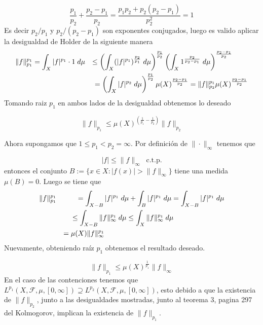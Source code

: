 \documentclass[12pt]{article}
\begin{document}
    \[\frac{p_1}{p_2}+\frac{p_2-p_1}{p_2} = \frac{p_1p_2+p_2(p_2-p_1)}{p_2^2} = 1\]
    Es decir $p_2/p_1$ y $p_2/(p_2-p_1)$ son exponentes conjugados, luego es valido aplicar 
    la desigualdad de Holder de la siguiente manera 
    \begin{equation*}
        \begin{aligned}
            & \|f\|_{p_1}^{p_1} = \int_X |f|^{p_1}\cdot1\;d\mu &\leq \left(\int_X (|f|^{p_1})^{\frac{p_2}{p_1}}\;d\mu\right)^{\frac{p_1}{p_2}}\left(\int_X 1^{\frac{p_2}{p_2-p_1}}\;d\mu\right)^{\frac{p_2-p_1}{p_2}}\hspace*{22pt} \\
            & & = \left(\int_X |f|^{p_2}\;d\mu\right)^{\frac{p_1}{p_2}}\mu(X)^{\frac{p_2-p_1}{p_2}} = \|f\|_{p_2}^{p_1}\mu(X)^{\frac{p_2-p_1}{p_2}}
        \end{aligned}
    \end{equation*}
    Tomando raiz $p_1$ en ambos lados de la desigualdad obtenemos lo deseado

    \[\|f\|_{p_1} \leq \mu(X)^{\left(\frac{1}{p_1}-\frac{1}{p_2}\right)}\|f\|_{p_2}\]

    Ahora supongamos que $1 \leq p_1 < p_2 = \infty$. Por definici\'on de 
    $\|\cdot\|_{\infty}$ tenemos que 

    \[|f| \leq \|f\|_{\infty} \;\; \text{c.t.p.}\]
    entonces el conjunto $B := \{x\in X : |f(x)| > \|f\|_{\infty}\}$ tiene una medida 
    $\mu(B) = 0$. Luego se tiene que 
    \begin{equation*}
        \begin{aligned}
            &\|f\|_{p_1}^{p_1} & = \int_{X-B} |f|^{p_1}\;d\mu+\int_B |f|^{p_1}\;d\mu = \int_{X-B} |f|^{p_1}\;d\mu \\
            & & \leq \int_{X-B} \|f\|_{\infty}^{p_1}\;d\mu \leq \int_{X} \|f\|_{\infty}^{p_1}\;d\mu \hspace*{72pt}\\
            & & = \mu(X)\|f\|_{\infty}^{p_1} \hspace*{170pt}
        \end{aligned}
    \end{equation*}
    Nuevamente, obteniendo ra\'iz $p_1$ obtenemos el resultado deseado.

    \[\|f\|_{p_1} \leq \mu(X)^{\frac{1}{p_1}}\|f\|_{\infty}\]
    En el caso de las contenciones tenemos que 
    $L^{p_1}(X,\mathcal{F},\mu,[0,\infty])\supseteq L^{p_2}(X,\mathcal{F},\mu,[0,\infty])$,
    esto debido a que la existencia de $\|f\|_{p_2}$, junto a las desigualdades mostradas,
    junto al teorema 3, pagina 297 del Kolmogorov, implican la existencia de $\|f\|_{p_1}$.
    \\ 
    
\end{document}
